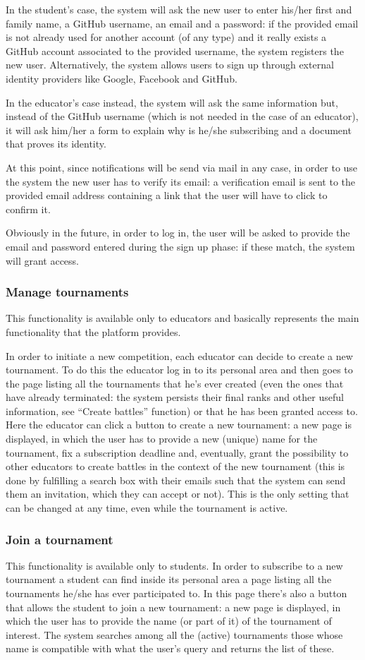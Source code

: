 In the student’s case, the system will ask the new user to enter his/her first and family name, a GitHub username, an email and a password: if the provided email is not already used for another account (of any type) and it really exists a GitHub account associated to the provided username, the system registers the new user. Alternatively, the system allows users to sign up through external identity providers like Google, Facebook and GitHub.

In the educator’s case instead, the system will ask the same information but, instead of the GitHub username (which is not needed in the case of an educator), it will ask him/her a form to explain why is he/she subscribing and a document that proves its identity.

At this point, since notifications will be send via mail in any case, in order to use the system the new user has to verify its email: a verification email is sent to the provided email address containing a link that the user will have to click to confirm it.

Obviously in the future, in order to log in, the user will be asked to provide the email and password entered during the sign up phase: if these match, the system will grant access.
\subsubsection{Manage tournaments}
This functionality is available only to educators and basically represents the main functionality that the platform provides.

In order to initiate a new competition, each educator can decide to create a new tournament. To do this the educator log in to its personal area and then goes to the page listing all the tournaments that he’s ever created (even the ones that have already terminated: the system persists their final ranks and other useful information, see “Create battles” function) or that he has been granted access to. Here the educator can click a button to create a new tournament: a new page is displayed, in which the user has to provide a new (unique) name for the tournament, fix a subscription deadline and, eventually, grant the possibility to other educators to create battles in the context of the new tournament (this is done by fulfilling a search box with their emails such that the system can send them an invitation, which they can accept or not). This is the only setting that can be changed at any time, even while the tournament is active.
\subsubsection{Join a tournament}
This functionality is available only to students. In order to subscribe to a new tournament a student can find inside its personal area a page listing all the tournaments he/she has ever participated to. In this page there’s also a button that allows the student to join a new tournament: a new page is displayed, in which the user has to provide the name (or part of it) of the tournament of interest. The system searches among all the (active) tournaments those whose name is compatible with what the user’s query and returns the list of these.

